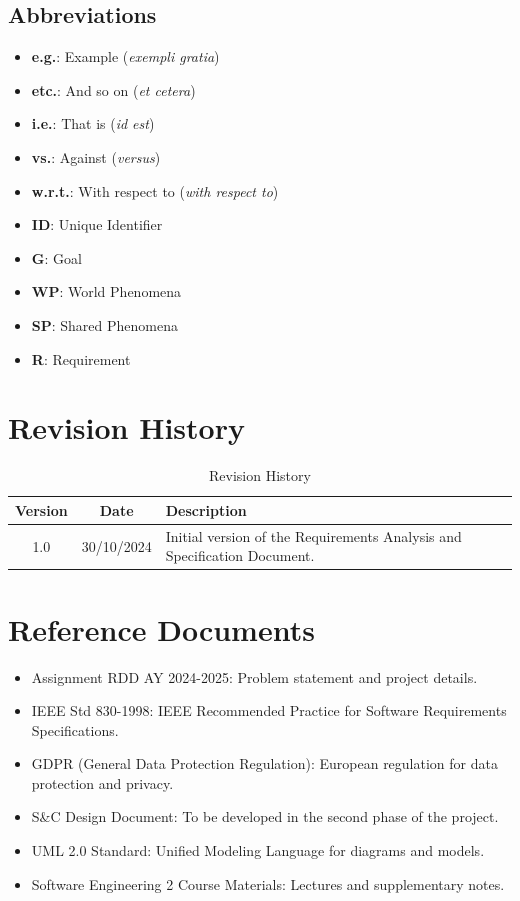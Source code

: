 \subsection{Abbreviations}\label{subsec:abbreviations}
\begin{itemize}
    \item \textbf{e.g.}: Example (\textit{exempli gratia})
    \item \textbf{etc.}: And so on (\textit{et cetera})
    \item \textbf{i.e.}: That is (\textit{id est})
    \item \textbf{vs.}: Against (\textit{versus})
    \item \textbf{w.r.t.}: With respect to (\textit{with respect to})
    \item \textbf{ID}: Unique Identifier
    \item \textbf{G}: Goal
    \item \textbf{WP}: World Phenomena
    \item \textbf{SP}: Shared Phenomena
    \item \textbf{R}: Requirement
\end{itemize}

\section{Revision History}\label{sec:revision-history}
\begin{table}[H]
    \centering
    \renewcommand{\arraystretch}{1.5}
    \begin{tabular}{|c|c|p{}|}
        \hline
        \rowcolor[HTML]{5C8A99}
        \textbf{Version} & \textbf{Date} & \textbf{Description} \\ \hline
        1.0              & 30/10/2024    & Initial version of the Requirements Analysis and Specification Document. \\ \hline
    \end{tabular}
    \caption{Revision History}
\end{table}

\section{Reference Documents}\label{sec:reference-documents}
\begin{itemize}
    \item Assignment RDD AY 2024-2025: Problem statement and project details.
    \item IEEE Std 830-1998: IEEE Recommended Practice for Software Requirements Specifications.
    \item GDPR (General Data Protection Regulation): European regulation for data protection and privacy.
    \item S\&C Design Document: To be developed in the second phase of the project.
    \item UML 2.0 Standard: Unified Modeling Language for diagrams and models.
    \item Software Engineering 2 Course Materials: Lectures and supplementary notes.
\end{itemize}


